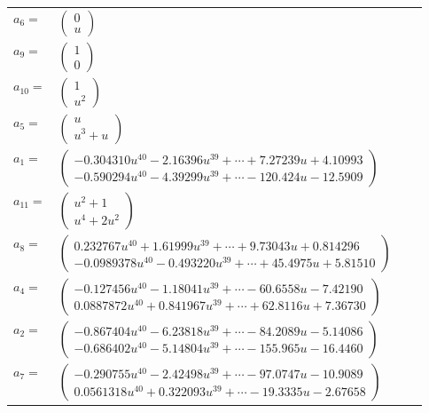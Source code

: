 \documentclass[1p]{elsarticle_modified}
\theoremstyle{definition}
\begin{document}
\begin{tabular}{m{7pt} m{180pt} m{7pt} m{180pt} }
\flushright $a_{6}=$&$\begin{pmatrix}0\\u\end{pmatrix}$ \\
\flushright $a_{9}=$&$\begin{pmatrix}1\\0\end{pmatrix}$ \\
\flushright $a_{10}=$&$\begin{pmatrix}1\\u^2\end{pmatrix}$ \\
\flushright $a_{5}=$&$\begin{pmatrix}u\\u^3+u\end{pmatrix}$ \\
\flushright $a_{1}=$&$\begin{pmatrix}-0.304310 u^{40}-2.16396 u^{39}+\cdots+7.27239 u+4.10993\\-0.590294 u^{40}-4.39299 u^{39}+\cdots-120.424 u-12.5909\end{pmatrix}$ \\
\flushright $a_{11}=$&$\begin{pmatrix}u^2+1\\u^4+2 u^2\end{pmatrix}$ \\
\flushright $a_{8}=$&$\begin{pmatrix}0.232767 u^{40}+1.61999 u^{39}+\cdots+9.73043 u+0.814296\\-0.0989378 u^{40}-0.493220 u^{39}+\cdots+45.4975 u+5.81510\end{pmatrix}$ \\
\flushright $a_{4}=$&$\begin{pmatrix}-0.127456 u^{40}-1.18041 u^{39}+\cdots-60.6558 u-7.42190\\0.0887872 u^{40}+0.841967 u^{39}+\cdots+62.8116 u+7.36730\end{pmatrix}$ \\
\flushright $a_{2}=$&$\begin{pmatrix}-0.867404 u^{40}-6.23818 u^{39}+\cdots-84.2089 u-5.14086\\-0.686402 u^{40}-5.14804 u^{39}+\cdots-155.965 u-16.4460\end{pmatrix}$ \\
\flushright $a_{7}=$&$\begin{pmatrix}-0.290755 u^{40}-2.42498 u^{39}+\cdots-97.0747 u-10.9089\\0.0561318 u^{40}+0.322093 u^{39}+\cdots-19.3335 u-2.67658\end{pmatrix}$ \\

\end{tabular}
\end{document}
